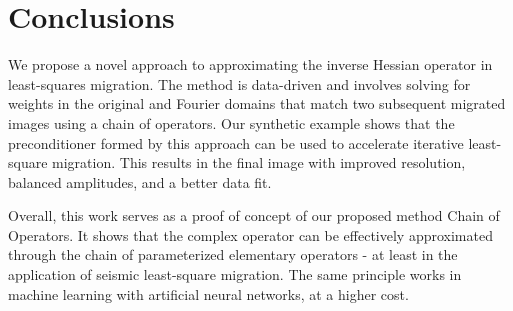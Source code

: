 



\section{Conclusions}

We propose a novel approach to approximating the inverse Hessian operator in least-squares migration. The method is data-driven and involves solving for weights in the original and Fourier domains that match two subsequent migrated images using a chain of operators. Our synthetic example shows that the preconditioner formed by this approach can be used to accelerate iterative least-square migration. This results in the final image with improved resolution, balanced amplitudes, and a better data fit.

Overall, this work serves as a proof of concept of our proposed method Chain of Operators. It shows that the complex operator can be effectively approximated through the chain of parameterized elementary operators - at least in the application of seismic least-square migration. The same principle works in machine learning with artificial neural networks, at a higher cost.





